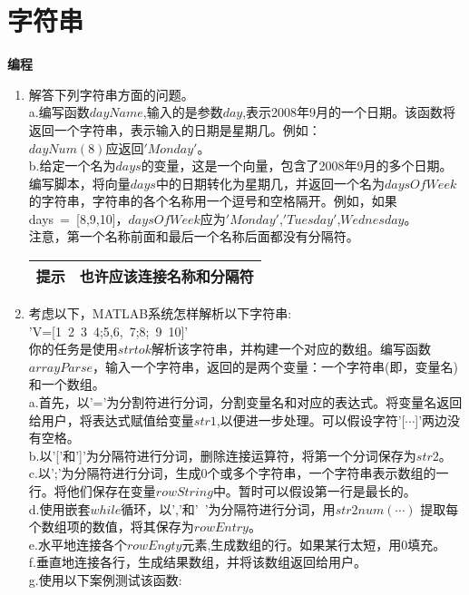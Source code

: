\documentclass[UTF8]{ctexart}
\begin{document}
\section{字符串}
\textbf{编程}
\begin{enumerate}

\item 解答下列字符串方面的问题。\\
a.编写函数$dayName$,输入的是参数$day$,表示2008年9月的一个日期。该函数将返回一个字符串，表示输入的日期是星期几。例如：\\
$dayNum(8)应返回'Monday'$。\\
b.给定一个名为$days$的变量，这是一个向量，包含了2008年9月的多个日期。编写脚本，将向量$days$中的日期转化为星期几，并返回一个名为$daysOfWeek$的字符串，字符串的各个名称用一个逗号和空格隔开。例如，如果days\ =\ [8,9,10]，$daysOfWeek$应为$'Monday'$,$'Tuesday'$,$Wednesday$。\\
注意，第一个名称前面和最后一个名称后面都没有分隔符。
\begin{table}[H]
\centering
\begin{tabular}{|p{1cm}p{9cm}|}
	\hline
	\textbf{提示}&也许应该连接名称和分隔符\\
	\hline
\end{tabular}
\end{table}
\item 考虑以下，MATLAB系统怎样解析以下字符串:\\
'V=[1\ 2\ 3\ 4;5,6,\ 7;8;\ 9\ 10]'\\
你的任务是使用$strtok$解析该字符串，并构建一个对应的数组。编写函数$arrayParse$，输入一个字符串，返回的是两个变量：一个字符串(即，变量名)和一个数组。\\
a.首先，以'='为分割符进行分词，分割变量名和对应的表达式。将变量名返回给用户，将表达式赋值给变量$str1$,以便进一步处理。可以假设字符'[$\cdots$]'两边没有空格。\\
b.以'['和']'为分隔符进行分词，删除连接运算符，将第一个分词保存为$str2$。\\
c.以';'为分隔符进行分词，生成0个或多个字符串，一个字符串表示数组的一行。将他们保存在变量$rowString$中。暂时可以假设第一行是最长的。\\
d.使用嵌套$while$循环，以','和'\ '为分隔符进行分词，用$str2num(\cdots) $ 提取每个数组项的数值，将其保存为$rowEntry$。\\
e.水平地连接各个$rowEngty$元素,生成数组的行。如果某行太短，用0填充。\\
f.垂直地连接各行，生成结果数组，并将该数组返回给用户。\\
g.使用以下案例测试该函数:\\

\end{enumerate}
\end{document}
